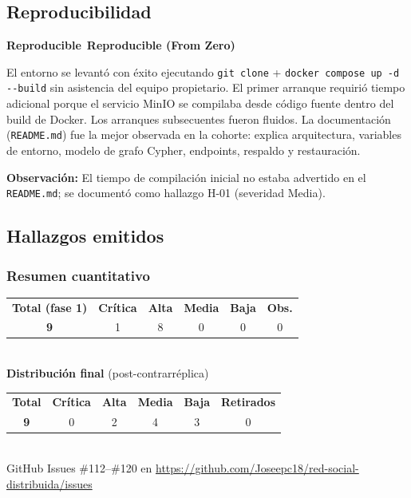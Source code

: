 \documentclass[10pt,a4paper]{article}
\newcommand{\code}[1]{\nolinkurl{#1}}
\newcommand{\badgeCritica}{\colorbox{red!20}{\textcolor{red!80!black}{\textbf{\footnotesize Crítica}}}}
\newcommand{\badgeAlta}{\colorbox{orange!20}{\textcolor{orange!90!black}{\textbf{\footnotesize Alta}}}}
\newcommand{\badgeMedia}{\colorbox{yellow!35}{\textcolor{brown!90!black}{\textbf{\footnotesize Media}}}}
\newcommand{\badgeBaja}{\colorbox{blue!15}{\textcolor{blue!80!black}{\textbf{\footnotesize Baja}}}}
\newcommand{\badgeReproducible}{\colorbox{green!20}{\textcolor{green!60!black}{\textbf{\footnotesize Reproducible}}}}
\begin{document}
\subsection{Reproducibilidad}

\noindent\badgeReproducible\ \textbf{Reproducible (From Zero)}

\noindent El entorno se levantó con éxito ejecutando \code{git clone} + \code{docker compose up -d --build} sin asistencia del equipo propietario. El primer arranque requirió tiempo adicional porque el servicio MinIO se compilaba desde código fuente dentro del build de Docker. Los arranques subsecuentes fueron fluidos. La documentación (\code{README.md}) fue la mejor observada en la cohorte: explica arquitectura, variables de entorno, modelo de grafo Cypher, endpoints, respaldo y restauración.

\noindent\textbf{Observación:} El tiempo de compilación inicial no estaba advertido en el \code{README.md}; se documentó como hallazgo H-01 (severidad Media).

\subsection{Hallazgos emitidos}

\subsubsection{Resumen cuantitativo}

\begin{tcolorbox}[colback=lightgray!50,colframe=upseblue!30,arc=2mm]
\centering
\begin{tabular}{cccccc}
\textbf{Total (fase 1)} & \badgeCritica & \badgeAlta & \badgeMedia & \badgeBaja & \textbf{Obs.}\\[4pt]
\textbf{9} & 1 & 8 & 0 & 0 & 0 \\[0.6em]
\end{tabular}\\[0.3em]
\textbf{Distribución final} (post-contrarréplica)\\[0.3em]
\begin{tabular}{cccccc}
\textbf{Total} & \badgeCritica & \badgeAlta & \badgeMedia & \badgeBaja & \textbf{Retirados}\\[4pt]
\textbf{9} & 0 & 2 & 4 & 3 & 0 \\
\end{tabular}\\[0.4em]
\small GitHub Issues \#112--\#120 en \url{https://github.com/Joseepc18/red-social-distribuida/issues}
\end{tcolorbox}
\end{document}
